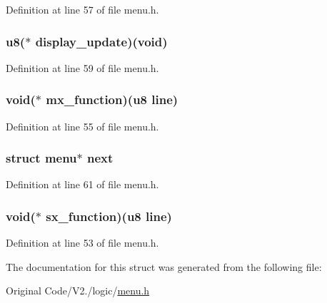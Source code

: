 \-Definition at line 57 of file menu.\-h.

\hypertarget{structmenu_ab8460526701ec3ad0a231a398a963882}{
\subsubsection[{display\-\_\-update}]{\setlength{\rightskip}{0pt plus 5cm}u8($\ast$ {\bf display\-\_\-update})(void)}}\label{structmenu_ab8460526701ec3ad0a231a398a963882}


\-Definition at line 59 of file menu.\-h.

\hypertarget{structmenu_a5e810089609d71c50a4fafb16304fc44}{
\subsubsection[{mx\-\_\-function}]{\setlength{\rightskip}{0pt plus 5cm}void($\ast$ {\bf mx\-\_\-function})(u8 line)}}\label{structmenu_a5e810089609d71c50a4fafb16304fc44}


\-Definition at line 55 of file menu.\-h.

\hypertarget{structmenu_aa35c173e9c9b7cab0ea757bbfd988893}{
\subsubsection[{next}]{\setlength{\rightskip}{0pt plus 5cm}struct {\bf menu}$\ast$ {\bf next}}}\label{structmenu_aa35c173e9c9b7cab0ea757bbfd988893}


\-Definition at line 61 of file menu.\-h.

\hypertarget{structmenu_ab821fa0d7f541480110bc8a674b42c79}{
\subsubsection[{sx\-\_\-function}]{\setlength{\rightskip}{0pt plus 5cm}void($\ast$ {\bf sx\-\_\-function})(u8 line)}}\label{structmenu_ab821fa0d7f541480110bc8a674b42c79}


\-Definition at line 53 of file menu.\-h.



\-The documentation for this struct was generated from the following file\-:\begin{DoxyCompactItemize}
\item 
\-Original Code/\-V2./logic/\hyperlink{menu_8h}{menu.\-h}\end{DoxyCompactItemize}
